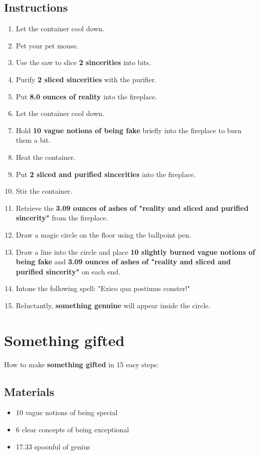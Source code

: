 \documentclass{article}
\begin{document}
\subsection{Instructions}\begin{enumerate}
\item 
Let the container cool down.
\item 
Pet your pet mouse.
\item 
Use the saw to slice \textbf{2 sincerities} into bits.
\item 
Purify \textbf{2 sliced sincerities} with the purifier.
\item 
Put \textbf{8.0 ounces of reality} into the fireplace.
\item 
Let the container cool down.
\item 
Hold \textbf{10 vague notions of being fake} briefly into the fireplace to burn them a bit.
\item 
Heat the container.
\item 
Put \textbf{2 sliced and purified sincerities} into the fireplace.
\item 
Stir the container.
\item 
Retrieve the \textbf{3.09 ounces of ashes of "reality and sliced and purified sincerity"} from the fireplace.
\item 
Draw a magic circle on the floor using the ballpoint pen.
\item 
Draw a line into the circle and place \textbf{10 slightly burned vague notions of being fake} and \textbf{3.09 ounces of ashes of "reality and sliced and purified sincerity"} on each end.
\item 
Intone the following spell: "Exico qua postimus conster!"
\item 
Reluctantly, \textbf{something genuine} will appear inside the circle.
\end{enumerate}
\newpage
\section{Something gifted}How to make \textbf{something gifted} in 15 easy steps:

\subsection{Materials}\begin{itemize}
\item 
10 vague notions of being special
\item 
6 clear concepts of being exceptional
\item 
17.33 spoonful of genius
\end{itemize}
\end{document}

